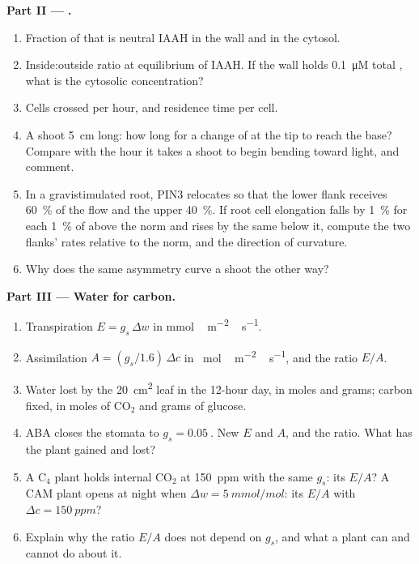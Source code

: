 \begin{problem}
\medskip
\noindent\textbf{Part II --- .}
\begin{enumerate}[resume]
  \item Fraction of  that is neutral IAAH in the wall and in the
        cytosol.
  \item Inside:outside ratio at equilibrium of IAAH. If the wall holds
        \qty{0.1}{\micro M} total , what is the cytosolic
        concentration?
  \item Cells crossed per hour, and residence time per cell.
  \item A shoot \qty{5}{cm} long: how long for a change of  at the
        tip to reach the base? Compare with the hour it takes a shoot to
        begin bending toward light, and comment.
  \item In a gravistimulated root, PIN3 relocates so that the lower
        flank receives \qty{60}{\%} of the flow and the upper
        \qty{40}{\%}. If root cell elongation falls by \qty{1}{\%} for
        each \qty{1}{\%} of  above the norm and rises by the same
        below it, compute the two flanks' rates relative to the norm,
        and the direction of curvature.
  \item Why does the same asymmetry curve a shoot the other way?
\end{enumerate}

\medskip
\noindent\textbf{Part III --- Water for carbon.}
\begin{enumerate}[resume]
  \item Transpiration $E = g_{s}\,\Delta w$ in \unit{mmol\,m^{-2}\,s^{-1}}.
  \item Assimilation $A = (g_{s}/1.6)\,\Delta c$ in \unit{\micro
        mol\,m^{-2}\,s^{-1}}, and the ratio $E/A$.
  \item Water lost by the \qty{20}{cm^2} leaf in the 12-hour day, in
        moles and grams; carbon fixed, in moles of CO$_{2}$ and grams of
        glucose.
  \item ABA closes the stomata to $g_{s} = \qty{0.05}{}$. New $E$ and
        $A$, and the ratio. What has the plant gained and lost?
  \item A C$_{4}$ plant holds internal CO$_{2}$ at \qty{150}{ppm} with
        the same $g_{s}$: its $E/A$? A CAM plant opens at night when
        $\Delta w = \qty{5}{mmol/mol}$: its $E/A$ with $\Delta c =
        \qty{150}{ppm}$?
  \item Explain why the ratio $E/A$ does not depend on $g_{s}$, and
        what a plant can and cannot do about it.
\end{enumerate}


\end{problem}
